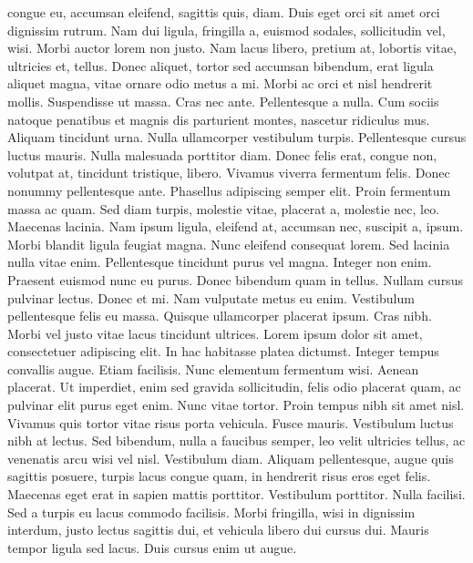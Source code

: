 congue eu, accumsan eleifend, sagittis quis, diam. Duis eget orci sit amet orci
dignissim rutrum.  Nam dui ligula, fringilla a, euismod sodales, sollicitudin
vel, wisi. Morbi auctor lorem non justo. Nam lacus libero, pretium at, lobortis
vitae, ultricies et, tellus. Donec aliquet, tortor sed accumsan bibendum, erat
ligula aliquet magna, vitae ornare odio metus a mi. Morbi ac orci et nisl
hendrerit mollis. Suspendisse ut massa. Cras nec ante. Pellentesque a nulla. Cum
sociis natoque penatibus et magnis dis parturient montes, nascetur ridiculus
mus. Aliquam tincidunt urna. Nulla ullamcorper vestibulum turpis. Pellentesque
cursus luctus mauris.  Nulla malesuada porttitor diam. Donec felis erat, congue
non, volutpat at, tincidunt tristique, libero. Vivamus viverra fermentum felis.
Donec nonummy pellentesque ante. Phasellus adipiscing semper elit. Proin
fermentum massa ac quam. Sed diam turpis, molestie vitae, placerat a, molestie
nec, leo. Maecenas lacinia. Nam ipsum ligula, eleifend at, accumsan nec,
suscipit a, ipsum. Morbi blandit ligula feugiat magna. Nunc eleifend consequat
lorem. Sed lacinia nulla vitae enim. Pellentesque tincidunt purus vel magna.
Integer non enim. Praesent euismod nunc eu purus. Donec bibendum quam in tellus.
Nullam cursus pulvinar lectus. Donec et mi. Nam vulputate metus eu enim.
Vestibulum pellentesque felis eu massa.  Quisque ullamcorper placerat ipsum.
Cras nibh. Morbi vel justo vitae lacus tincidunt ultrices. Lorem ipsum dolor sit
amet, consectetuer adipiscing elit. In hac habitasse platea dictumst. Integer
tempus convallis augue.  Etiam facilisis. Nunc elementum fermentum wisi. Aenean
placerat. Ut imperdiet, enim sed gravida sollicitudin, felis odio placerat quam,
ac pulvinar elit purus eget enim. Nunc vitae tortor. Proin tempus nibh sit amet
nisl.  Vivamus quis tortor vitae risus porta vehicula.  Fusce mauris. Vestibulum
luctus nibh at lectus. Sed bibendum, nulla a faucibus semper, leo velit
ultricies tellus, ac venenatis arcu wisi vel nisl. Vestibulum diam. Aliquam
pellentesque, augue quis sagittis posuere, turpis lacus congue quam, in
hendrerit risus eros eget felis. Maecenas eget erat in sapien mattis porttitor.
Vestibulum porttitor. Nulla facilisi. Sed a turpis eu lacus commodo facilisis.
Morbi fringilla, wisi in dignissim interdum, justo lectus sagittis dui, et
vehicula libero dui cursus dui. Mauris tempor ligula sed lacus. Duis cursus enim
ut augue.


